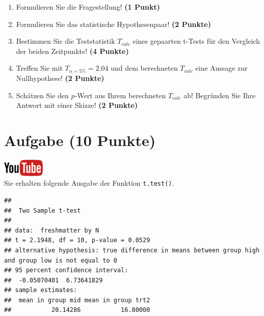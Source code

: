 \documentclass[a4paper, 10pt]{scrartcl}\usepackage[]{graphicx}\usepackage[]{xcolor}
\makeatletter
\newenvironment{kframe}{%
 \def\at@end@of@kframe{}%
 \ifinner\ifhmode%
  \def\at@end@of@kframe{\end{minipage}}%
  \begin{minipage}{\columnwidth}%
 \fi\fi%
 \def\FrameCommand##1{\hskip\@totalleftmargin \hskip-\fboxsep
 \colorbox{shadecolor}{##1}\hskip-\fboxsep
     \hskip-\linewidth \hskip-\@totalleftmargin \hskip\columnwidth}%
 \MakeFramed {\advance\hsize-\width
   \@totalleftmargin\z@ \linewidth\hsize
   \@setminipage}}%
 {\par\unskip\endMakeFramed%
 \at@end@of@kframe}
\newenvironment{knitrout}{}{} %
\makeatother
\begin{document}
\begin{enumerate}
\item Formulieren Sie die Fragestellung! \textbf{(1 Punkt)}
\item Formulieren Sie das statistische Hypothesenpaar! \textbf{(2
    Punkte)}
\item Bestimmen Sie die Teststatistik $T_{calc}$ eines gepaarten t-Tests f{\"u}r den
  Vergleich der beiden Zeitpunkte! \textbf{(4 Punkte)}
\item Treffen Sie mit $T_{\alpha = 5\%} = 2.04$ und dem berechneten $T_{calc}$ eine Aussage
  zur Nullhypothese! \textbf{(2 Punkte)}
\item Sch{\"a}tzen Sie den $p$-Wert aus Ihrem berechneten $T_{calc}$ ab!
  Begr{\"u}nden Sie Ihre Antwort mit einer Skizze! \textbf{(2
    Punkte)}
\end{enumerate} 
\clearpage

\section{Aufgabe \hfill (10 Punkte)}

\hfill\href{https://youtu.be/exDo7AyHl4Q}{\includegraphics[width =
  2cm]{img/youtube}}\\[1Ex]

Sie erhalten folgende \Rlogo Ausgabe der Funktion \texttt{t.test()}.

\begin{knitrout}
\color{fgcolor}\begin{kframe}
\begin{verbatim}
## 
## 	Two Sample t-test
## 
## data:  freshmatter by N
## t = 2.1948, df = 10, p-value = 0.0529
## alternative hypothesis: true difference in means between group high and group low is not equal to 0
## 95 percent confidence interval:
##  -0.05070401  6.73641829
## sample estimates:
##  mean in group mid mean in group trt2 
##           20.14286           16.80000
\end{verbatim}
\end{kframe}
\end{knitrout}
\end{document}
